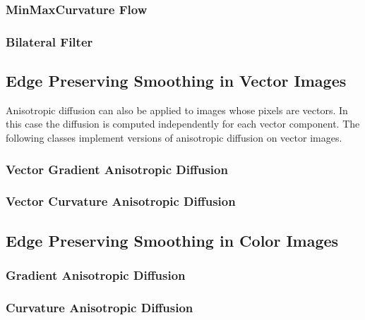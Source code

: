 \subsubsection{MinMaxCurvature Flow}
\label{sec:MinMaxCurvatureFlowImageFilter}



\subsubsection{Bilateral Filter}
\label{sec:BilateralImageFilter}



\subsection{Edge Preserving Smoothing in Vector Images}
\label{sec:VectorAnisotropicDiffusion}

Anisotropic diffusion can also be applied to images whose pixels are vectors.
In this case the diffusion is computed independently for each vector
component.  The following classes implement versions of anisotropic diffusion
on vector images.

\subsubsection{Vector Gradient Anisotropic Diffusion}
\label{sec:VectorGradientAnisotropicDiffusionImageFilter}



\subsubsection{Vector Curvature Anisotropic Diffusion}
\label{sec:VectorCurvatureAnisotropicDiffusionImageFilter}



\subsection{Edge Preserving Smoothing in Color Images}
\label{sec:ColorAnisotropicDiffusion}

\subsubsection{Gradient Anisotropic Diffusion}
\label{sec:ColorGradientAnisotropicDiffusion}



\subsubsection{Curvature Anisotropic Diffusion}
\label{sec:ColorCurvatureAnisotropicDiffusion}



